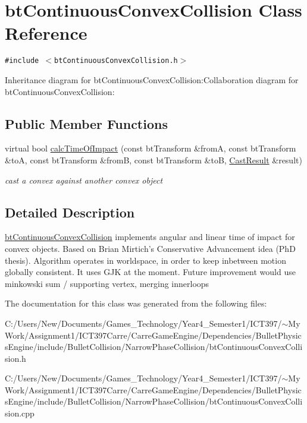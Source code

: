 \hypertarget{classbt_continuous_convex_collision}{
\section{btContinuousConvexCollision Class Reference}
\label{classbt_continuous_convex_collision}
}
{\tt \#include $<$btContinuousConvexCollision.h$>$}

Inheritance diagram for btContinuousConvexCollision:Collaboration diagram for btContinuousConvexCollision:\subsection*{Public Member Functions}
\begin{CompactItemize}
\item 
\hypertarget{classbt_continuous_convex_collision_fc75a57bddfeded52781bbd65ee16f37}{
virtual bool \hyperlink{classbt_continuous_convex_collision_fc75a57bddfeded52781bbd65ee16f37}{calcTimeOfImpact} (const btTransform \&fromA, const btTransform \&toA, const btTransform \&fromB, const btTransform \&toB, \hyperlink{structbt_convex_cast_1_1_cast_result}{CastResult} \&result)}
\label{classbt_continuous_convex_collision_fc75a57bddfeded52781bbd65ee16f37}

\begin{CompactList}\small\item\em cast a convex against another convex object \item\end{CompactList}\end{CompactItemize}


\subsection{Detailed Description}
\hyperlink{classbt_continuous_convex_collision}{btContinuousConvexCollision} implements angular and linear time of impact for convex objects. Based on Brian Mirtich's Conservative Advancement idea (PhD thesis). Algorithm operates in worldspace, in order to keep inbetween motion globally consistent. It uses GJK at the moment. Future improvement would use minkowski sum / supporting vertex, merging innerloops 

The documentation for this class was generated from the following files:\begin{CompactItemize}
\item 
C:/Users/New/Documents/Games\_\-Technology/Year4\_\-Semester1/ICT397/$\sim$My Work/Assignment1/ICT397Carre/CarreGameEngine/Dependencies/BulletPhysicsEngine/include/BulletCollision/NarrowPhaseCollision/btContinuousConvexCollision.h\item 
C:/Users/New/Documents/Games\_\-Technology/Year4\_\-Semester1/ICT397/$\sim$My Work/Assignment1/ICT397Carre/CarreGameEngine/Dependencies/BulletPhysicsEngine/include/BulletCollision/NarrowPhaseCollision/btContinuousConvexCollision.cpp\end{CompactItemize}
